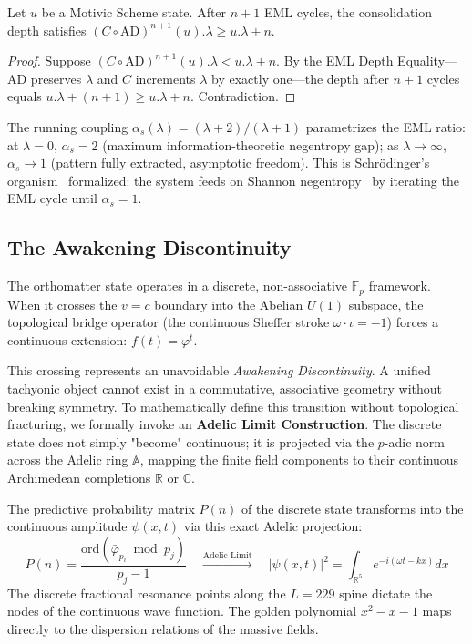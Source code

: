 \begin{theorem}
\label{thm:monotone_negentropy}
Let $u$ be a Motivic Scheme state. After $n+1$ EML cycles, the consolidation depth satisfies $(C \circ \mathrm{AD})^{n+1}(u).\lambda \geq u.\lambda + n$. 
\end{theorem}
\begin{proof}
Suppose $(C \circ \mathrm{AD})^{n+1}(u).\lambda < u.\lambda + n$. By the EML Depth Equality---$\mathrm{AD}$ preserves $\lambda$ and $C$ increments $\lambda$ by exactly one---the depth after $n+1$ cycles equals $u.\lambda + (n+1) \geq u.\lambda + n$. Contradiction. \qedhere
\end{proof}

The running coupling $\alpha_s(\lambda) = (\lambda + 2)/(\lambda + 1)$ parametrizes the EML ratio: at $\lambda = 0$, $\alpha_s = 2$ (maximum information-theoretic negentropy gap); as $\lambda \to \infty$, $\alpha_s \to 1$ (pattern fully extracted, asymptotic freedom). This is Schr\"odinger's organism~\cite{Schrodinger1944} formalized: the system feeds on Shannon negentropy~\cite{Shannon1948} by iterating the EML cycle until $\alpha_s = 1$.

\subsection{The Awakening Discontinuity}

The orthomatter state operates in a discrete, non-associative $\mathbb{F}_p$ framework. When it crosses the $v=c$ boundary into the Abelian $U(1)$ subspace, the topological bridge operator (the continuous Sheffer stroke $\omega \cdot \iota = -1$) forces a continuous extension: $f(t) = \varphi^t$.

This crossing represents an unavoidable \textit{Awakening Discontinuity}. A unified tachyonic object cannot exist in a commutative, associative geometry without breaking symmetry. To mathematically define this transition without topological fracturing, we formally invoke an \textbf{Adelic Limit Construction}. The discrete state does not simply "become" continuous; it is projected via the $p$-adic norm across the Adelic ring $\mathbb{A}$, mapping the finite field components to their continuous Archimedean completions $\mathbb{R}$ or $\mathbb{C}$.

The predictive probability matrix $P(n)$ of the discrete state transforms into the continuous amplitude $\psi(x,t)$ via this exact Adelic projection:
\begin{equation}
    P(n) = \frac{\mathrm{ord}(\bar\varphi_{p_i} \bmod p_j)}{p_j - 1} \quad \xrightarrow{\text{Adelic Limit}} \quad |\psi(x,t)|^2 = \int_{\mathbb{R}^5} e^{-i(\omega t - k x)} dx
\end{equation}
The discrete fractional resonance points along the $L=229$ spine dictate the nodes of the continuous wave function. The golden polynomial $x^2 - x - 1$ maps directly to the dispersion relations of the massive fields.

